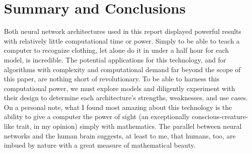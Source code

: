 \documentclass[a4paper,10 pt]{article}
\begin{document}
\section{Summary and Conclusions}
Both neural network architectures used in this report displayed powerful results with relatively little computational time or power. Simply to be able to teach a computer to recognize clothing, let alone do it in under a half hour for each model, is incredible. The potential applications for this technology, and for algorithms with complexity and computational demand far beyond the scope of this paper, are nothing short of revolutionary. To be able to harness this computational power, we must explore models and diligently experiment with their design to determine each architecture's strengths, weaknesses, and use cases. On a personal note, what I found most amazing about this technology is the ability to give a computer the power of sight (an exceptionally conscious-creature-like trait, in my opinion) simply with mathematics. The parallel between neural networks and the human brain suggests, at least to me, that humans, too, are imbued by nature with a great measure of mathematical beauty.
\end{document}
